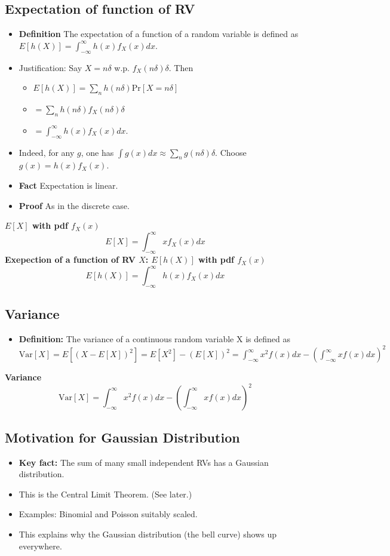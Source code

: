 \documentclass{article}
\newcommand{\x}[1]{\textrm{#1}}
\newcommand{\pr}[1]{\textrm{Pr}[#1]}
\newcommand{\sumlim}[3]{\sum\limits_{#1}^{#2}#3}
\newcommand{\eq}[1]{\begin{equation}#1\end{equation}}
\newcommand{\eqs}[1]{\begin{mdframed}#1\end{mdframed}}
\newcommand{\items}[1]{\begin{itemize}#1\end{itemize}}
\newcommand{\E}[1]{E[#1]}
\newcommand{\var}[1]{\x{Var}[#1]}
\newcommand{\intlim}[2]{\int_{#1}^{#2}}
\begin{document}
\subsection*{Expectation of function of RV}
\items{
	\item \textbf{Definition} The expectation of a function of a random variable is defined as $\E{h(X)} =\intlim{-\infty}{\infty}h(x)f_X (x)dx$.
	\item Justification: Say $X = n\delta$ w.p. $f_X (n\delta)\delta$. Then
	\items{
		\item $\E{h(X)} = \sumlim{n}{}{h(n\delta)\pr{X = n\delta}}$
		\item $= \sumlim{n}{}{h(n\delta)f_X (n\delta)\delta}$
		\item $= \intlim{-\infty}{\infty}h(x)f_X (x)dx$.
	}
	\item Indeed, for any $g$, one has $\int g(x)dx \approx \sumlim{n}{}{g(n\delta)\delta}$. Choose $g(x) = h(x)f_X (x)$.
	\item \textbf{Fact} Expectation is linear.
	\item \textbf{Proof} As in the discrete case.
}
\eqs{
\textbf{$\E{X}$ with pdf $f_X(x)$}
\eq{\E{X} =\intlim{-\infty}{\infty}xf_X (x)dx}
\textbf{Exepection of a function of RV $X$: $\E{h(X)}$ with pdf $f_X(x)$}
\eq{\E{h(X)} =\intlim{-\infty}{\infty}h(x)f_X (x)dx}
}
\subsection*{Variance}
\items{
	\item \textbf{Definition:} The variance of a continuous random variable X is defined as $\var{X} = \E{(X-\E{X})^2} = \E{X^2}-(\E{X})^2= \intlim{-\infty}{\infty}x^2f(x)dx-(\intlim{-\infty}{\infty}xf(x)dx)^2$
}

\eqs{
\textbf{Variance}
\eq{\var{X} =\intlim{-\infty}{\infty}x^2f(x)dx-(\intlim{-\infty}{\infty}xf(x)dx)^2}
}
\subsection*{Motivation for Gaussian Distribution}
\items{
	\item \textbf{Key fact:} The sum of many small independent RVs has a Gaussian distribution.
	\item This is the Central Limit Theorem. (See later.)
	\item Examples: Binomial and Poisson suitably scaled.
	\item This explains why the Gaussian distribution (the bell curve) shows up everywhere.
}
\end{document}
